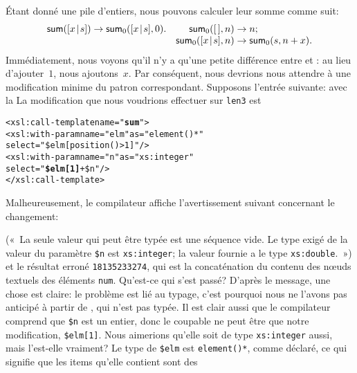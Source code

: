 Étant donné une pile d'entiers, nous pouvons calculer leur somme comme suit:
\begin{equation*}
\begin{array}{@{}r@{\;}l@{\;}lr@{\;}l@{\;}l@{}}
\fun{sum}(\cons{x}{s}) & \rightarrow & \fun{sum}_0(\cons{x}{s},0). &
\fun{sum}_0(\el,n) & \rightarrow & n;\\
&&& \fun{sum}_0(\cons{x}{s},n) & \rightarrow & \fun{sum}_0(s,n+x).
\end{array}
\end{equation*}
Immédiatement, nous voyons qu'il n'y a qu'une petite différence entre
 et : au lieu d'ajouter~\(1\), nous
ajoutons~\(x\). Par conséquent, nous devrions nous attendre à une
modification minime du patron \XSLT correspondant. Supposons l'entrée suivante:
\noindent avec la \DTD
{}
\noindent La modification que nous voudrions effectuer sur \texttt{len3} est
\begin{alltt}
\small        <xsl:call-template name="\textbf{sum}">
          <xsl:with-param name="elm" as="element()*"
                          select="\$elm[position()>1]"/>
          <xsl:with-param name="n" as="xs:integer"
                          select="\textbf{\$elm[1]} + \$n"/>
        </xsl:call-template>
\end{alltt}
Malheureusement, le compilateur \Saxon affiche l'avertissement suivant
concernant le changement:
(«~La seule valeur qui peut être typée est une séquence vide. Le type
exigé de la valeur du paramètre \texttt{\$n} est \texttt{xs:integer};
la valeur fournie a le type \texttt{xs:double}.~») et le résultat
erroné \texttt{18135233274}, qui est la concaténation du contenu des
nœuds textuels des éléments \texttt{num}. Qu'est-ce qui s'est
passé? D'après le message, une chose est claire: le problème est lié
au typage, c'est pourquoi nous ne l'avons pas anticipé à partir de
, qui n'est pas typée. Il est clair aussi que le
compilateur comprend que \texttt{\$n} est un entier, donc le coupable
ne peut être que notre modification, \texttt{\$elm[1]}. Nous aimerions
qu'elle soit de type \texttt{xs:integer} aussi, mais l'est-elle
vraiment? Le type de \texttt{\$elm} est \texttt{element()*}, comme
déclaré, ce qui signifie que les items qu'elle contient sont des
